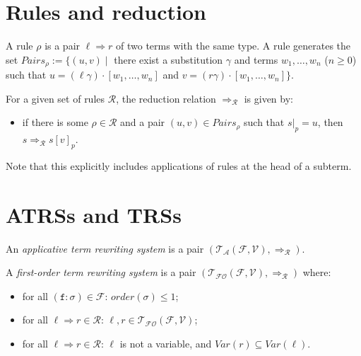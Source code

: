 \documentclass{lmcs}
\theoremstyle{theorem}\newtheorem{theorem}{Theorem}
\theoremstyle{theorem}\newtheorem{lemma}[theorem]{Lemma}
\theoremstyle{theorem}\newtheorem{corollary}[theorem]{Corollary}
\theoremstyle{definition}\newtheorem{definition}[theorem]{Definition}
\theoremstyle{definition}\newtheorem{example}[theorem]{Example}
\newcommand{\F}{\mathcal{F}}
\newcommand{\V}{\mathcal{V}}
\newcommand{\ATerms}{\mathcal{T}_{\mathcal{A}}}
\newcommand{\FOTerms}{\mathcal{T}_{\mathcal{FO}}}
\newcommand{\Rules}{\mathcal{R}}
\newcommand{\FV}{\mathit{Var}}
\newcommand{\order}{\mathit{order}}
\newcommand{\atype}{\sigma}
\newcommand{\identifier}[1]{\mathtt{#1}}
\newcommand{\afun}{\identifier{f}}
\newcommand{\arrz}{\Rightarrow}
\newcommand{\arr}[1]{\arrz_{#1}}
\begin{document}
\section{Rules and reduction}

A rule $\rho$ is a pair $\ell \arrz r$ of two terms with the same type.
A rule generates the set $\mathit{Pairs}_\rho := \{ (u,v) \mid$ there exist a substitution $\gamma$
and terms $w_1,\dots,w_n$ ($n \geq 0$) such that $u = (\ell\gamma) \cdot [w_1,\dots,w_n]$ and $v =
(r\gamma) \cdot [w_1,\dots,w_n] \}$.

For a given set of rules $\Rules$, the reduction relation $\arr{\Rules}$ is given by:
\begin{itemize}
\item if there is some $\rho \in \Rules$ and a pair $(u,v) \in \mathit{Pairs}_\rho$ such that
  $s|_p = u$, then $s \arr{\Rules} s[v]_p$.
\end{itemize}

\medskip
Note that this explicitly includes applications of rules at the head of a subterm.

\section{ATRSs and TRSs}

An \emph{applicative term rewriting system} is a pair $(\ATerms(\F,\V),\arr{\Rules})$.

A \emph{first-order term rewriting system} is a pair $(\FOTerms(\F,\V),\arr{\Rules})$ where:
\begin{itemize}
\item for all $(\afun : \atype) \in \F$: $\order(\atype) \leq 1$;
\item for all $\ell \arrz r \in \Rules$: $\ell,r \in \FOTerms(\F,\V)$;
\item for all $\ell \arrz r \in \Rules$: $\ell$ is not a variable, and $\FV(r) \subseteq \FV(\ell)$.
\end{itemize}
\end{document}
